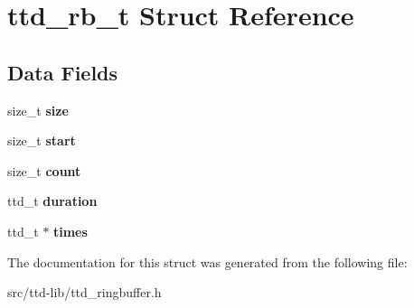\hypertarget{structttd__rb__t}{}\section{ttd\+\_\+rb\+\_\+t Struct Reference}
\label{structttd__rb__t}
\subsection*{Data Fields}
\begin{DoxyCompactItemize}
\item 
\hypertarget{structttd__rb__t_a033ad84b7ba51fe6e1ccd54adfe73806}{}size\+\_\+t {\bfseries size}\label{structttd__rb__t_a033ad84b7ba51fe6e1ccd54adfe73806}

\item 
\hypertarget{structttd__rb__t_a2b2b71d03d2a904761d84dfd0a72af3c}{}size\+\_\+t {\bfseries start}\label{structttd__rb__t_a2b2b71d03d2a904761d84dfd0a72af3c}

\item 
\hypertarget{structttd__rb__t_a650e0f47d412abf181b89b006302e99b}{}size\+\_\+t {\bfseries count}\label{structttd__rb__t_a650e0f47d412abf181b89b006302e99b}

\item 
\hypertarget{structttd__rb__t_a6865c25f64d54c46c10174c94d2bccd7}{}ttd\+\_\+t {\bfseries duration}\label{structttd__rb__t_a6865c25f64d54c46c10174c94d2bccd7}

\item 
\hypertarget{structttd__rb__t_a5035b2afb2403faf886746ef5f0d0ae9}{}ttd\+\_\+t $\ast$ {\bfseries times}\label{structttd__rb__t_a5035b2afb2403faf886746ef5f0d0ae9}

\end{DoxyCompactItemize}


The documentation for this struct was generated from the following file\+:\begin{DoxyCompactItemize}
\item 
src/ttd-\/lib/ttd\+\_\+ringbuffer.\+h\end{DoxyCompactItemize}
